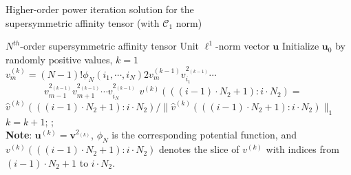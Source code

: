 \begin{algorithm}[!t]
\caption{\small Higher-order power iteration solution for the \protect\\
         \mbox{}\hspace{15ex}\small supersymmetric affinity tensor (with $\mathcal{C}_1$ norm)}
\label{alg2}
\begin{algorithmic}[1]
\REQUIRE \small $N^{th}$-order supersymmetric affinity tensor
\ENSURE  \small Unit $\mathcal{\ell}^1$-norm vector $\boldsymbol{u}$
\STATE   \small \; Initialize $\boldsymbol{u}_0$ by randomly positive values, $k=1$
\REPEAT
        \STATE $v_{m}^{(k)}=(N-1)!\phi_N(i_1,\cdots , i_N) 2v_{m}^{(k-1)}v_{i_1}^{2_{(k-1)}}\cdots$ \\
                 $\qquad \qquad v_{m-1}^{2_{(k-1)}}v_{m+1}^{2_{(k-1)}}\cdots v_{i_N}^{2_{(k-1)}}$
        \ENDFOR
        \STATE $v^{(k)}(((i-1)\cdot N_2+1) : i\cdot N_2)=$   \protect\\
               $\hat{v}^{(k)}(((i-1)\cdot N_2+1) : i\cdot N_2)/\lVert \hat{v}^{(k)}(((i-1)\cdot N_2+1):i\cdot N_2)\lVert_1$
        \ENDFOR
    \ENDFOR
    \STATE $k=k+1$;
;\protect\\
       \small \textbf{Note}: $\boldsymbol{u}^{(k)}=\boldsymbol{v}^{2_{(k)}}$, $\phi_N$ is the corresponding potential function,
       \small and $v^{(k)}(((i-1)\cdot N_2+1) : i\cdot N_2)$ denotes the slice of $v^{(k)}$ with
       \small indices from $(i-1)\cdot N_2+1$ to $i\cdot N_2$.
\end{algorithmic}
\end{algorithm}

